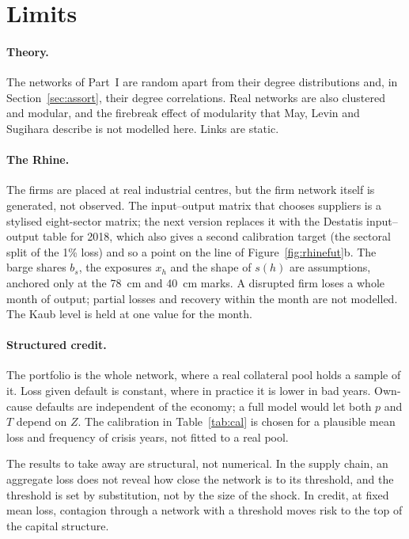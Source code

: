 \documentclass[11pt,a4paper]{article}
\theoremstyle{definition}
\theoremstyle{remark}
\begin{document}
\section{Limits}
\label{sec:limits}

\paragraph{Theory.} The networks of Part~I are random apart from their degree distributions and, in Section~\ref{sec:assort}, their degree correlations. Real networks are also clustered and modular, and the firebreak effect of modularity that May, Levin and Sugihara describe is not modelled here. Links are static.

\paragraph{The Rhine.} The firms are placed at real industrial centres, but the firm network itself is generated, not observed. The input--output matrix that chooses suppliers is a stylised eight-sector matrix; the next version replaces it with the Destatis input--output table for 2018, which also gives a second calibration target (the sectoral split of the 1\% loss) and so a point on the line of Figure~\ref{fig:rhinefut}b. The barge shares $b_s$, the exposures $x_h$ and the shape of $s(h)$ are assumptions, anchored only at the 78~cm and 40~cm marks. A disrupted firm loses a whole month of output; partial losses and recovery within the month are not modelled. The Kaub level is held at one value for the month.

\paragraph{Structured credit.} The portfolio is the whole network, where a real collateral pool holds a sample of it. Loss given default is constant, where in practice it is lower in bad years. Own-cause defaults are independent of the economy; a full model would let both $p$ and $T$ depend on $Z$. The calibration in Table~\ref{tab:cal} is chosen for a plausible mean loss and frequency of crisis years, not fitted to a real pool.

The results to take away are structural, not numerical. In the supply chain, an aggregate loss does not reveal how close the network is to its threshold, and the threshold is set by substitution, not by the size of the shock. In credit, at fixed mean loss, contagion through a network with a threshold moves risk to the top of the capital structure.
\end{document}
